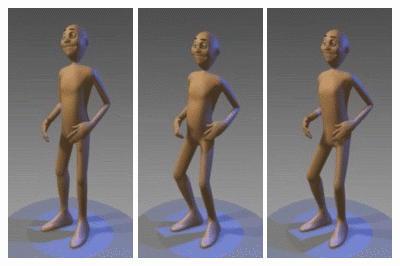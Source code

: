 \begin{figure}
\centering
\begin{minipage}[t]{0.22\linewidth}
\centering
\includegraphics[scale=0.30]{images/victor-1}
\end{minipage}
\hspace{0.3cm}
\begin{minipage}[t]{0.22\linewidth}
\centering
\includegraphics[scale=0.30]{images/victor-2}
\end{minipage}
\hspace{0.3cm}
\begin{minipage}[t]{0.22\linewidth}
\centering
\includegraphics[scale=0.30]{images/victor-3}

\end{minipage}
\end{figure}
